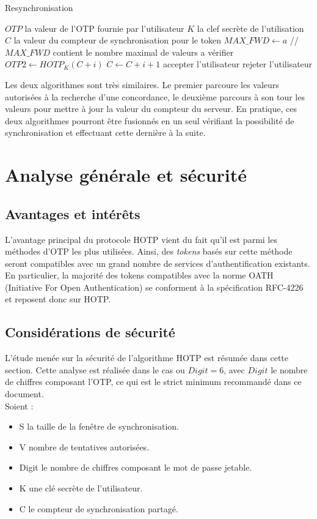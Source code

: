 \documentclass{../res/univ-projet}
\begin{document}
  \begin{algorithm}
    \caption{Resynchronisation}
    \label{HOTP:synch}
    
    \begin{algorithmic}
      \REQUIRE $OTP$ la valeur de l'OTP fournie par l'utilisateur
      \REQUIRE $K$ la clef secrète de l'utilisation
      \REQUIRE $C$ la valeur du compteur de synchronisation pour le token
      \STATE $MAX\_FWD \leftarrow a$ //$MAX\_FWD$ contient le nombre maximal de valeurs a vérifier
	\STATE $OTP2 \leftarrow HOTP_K(C + i)$
	  \STATE $C \leftarrow C + i + 1$
	  \STATE accepter l'utilisateur
	\ENDIF
      \ENDFOR
      \STATE rejeter l'utilisateur
    \end{algorithmic}
  \end{algorithm}
  
  Les deux algorithmes sont très similaires. Le premier parcoure les valeurs autorisées à la recherche d'une concordance, le deuxième parcours à son tour les valeurs pour 
  mettre à jour la valeur du compteur du serveur. En pratique, ces deux algorithmes pourront être fusionnés en un seul vérifiant la possibilité de synchronisation et 
  effectuant cette dernière à la suite.
  
\section{Analyse générale et sécurité}

  \subsection{Avantages et intérêts}
  L'avantage principal du protocole \og{}HOTP\fg{} vient du fait qu'il est parmi les méthodes d'OTP les plus utilisées. Ainsi, des \emph{tokens} basés sur cette méthode 
  seront compatibles avec un grand nombre de services d'authentification existants. En particulier, la majorité des tokens compatibles avec la norme OATH (Initiative For 
  Open Authentication) se conforment à la spécification RFC-4226 et reposent donc sur HOTP.
  
  \subsection{Considérations de sécurité}
  L'étude menée sur la sécurité de l'algorithme HOTP est résumée dans cette section.
  Cette analyse est réalisée dans le cas ou $Digit = 6$, avec $Digit$ le nombre de chiffres composant l'OTP, ce qui est le strict minimum 
  recommandé dans ce document.\\
  Soient :
  \begin{itemize}
   \item S la taille de la fenêtre de synchronisation.
   \item V nombre de tentatives autorisées.
   \item Digit le nombre de chiffres composant le mot de passe jetable.
   \item K une clé secrète de l'utilisateur.
   \item C le compteur de synchronisation partagé.
  \end{itemize}
\end{document}
